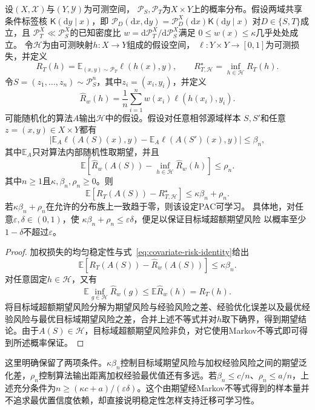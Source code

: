 \begin{theorem}[稳定性条件下的迁移可学习性]
\label{thm:transfer-stability-learning}
设$(X,\mathcal X)$与$(Y,\mathcal Y)$为可测空间，
$\mathcal P_S,\mathcal P_T$为$X\times Y$上的概率分布。假设两域共享条件标签核
$\mathsf K(\mathrm dy\mid x)$，即
$\mathcal P_D(\mathrm dx,\mathrm dy)
=\mathcal P_D^X(\mathrm dx)\mathsf K(\mathrm dy\mid x)$
对$D\in\{S,T\}$成立，且
$\mathcal P_T^X\ll\mathcal P_S^X$的已知密度比
$w=\mathrm d\mathcal P_T^X/\mathrm d\mathcal P_S^X$满足
$0\leq w(x)\leq\kappa$几乎处处成立。
令$\mathcal H$为由可测映射$h:X\to Y$组成的假设空间，
$\ell:Y\times Y\to[0,1]$为可测损失，并定义
\[
 R_T(h)=\mathbb E_{(x,y)\sim\mathcal P_T}\ell(h(x),y),\qquad
 R_{T,\mathcal H}^{\star}=\inf_{h\in\mathcal H}R_T(h).
\]
令$S=(z_1,\ldots,z_n)\sim\mathcal P_S^n$，其中$z_i=(x_i,y_i)$，并定义
\[
 \hat R_w(h)=\frac1n\sum_{i=1}^n w(x_i)\ell(h(x_i),y_i).
\]
可能随机化的算法$A$输出$\mathcal H$中的假设。假设对任意相邻源域样本
$S,S'$和任意$z=(x,y)\in X\times Y$都有
\[
 \left|\mathbb E_A\ell(A(S)(x),y)
 -\mathbb E_A\ell(A(S')(x),y)\right|\leq\beta_n,
\]
其中$\mathbb E_A$只对算法内部随机性取期望，并且
\[
 \mathbb E\!\left[\hat R_w(A(S))-
                  \inf_{h\in\mathcal H}\hat R_w(h)\right]
 \leq\rho_n.
\]
其中$n\geq1$且$\kappa,\beta_n,\rho_n\geq0$。则
\begin{equation}
 \mathbb E[R_T(A(S))-R_{T,\mathcal H}^{\star}]
 \leq\kappa\beta_n+\rho_n.
 \label{eq:transfer-stability-excess}
\end{equation}
若$\kappa\beta_n+\rho_n$在允许的分布族上一致趋于零，则该设定PAC可学习。
具体地，对任意$\varepsilon,\delta\in(0,1)$，使
$\kappa\beta_n+\rho_n\leq\varepsilon\delta$，便足以保证目标域超额期望风险
以概率至少$1-\delta$不超过$\varepsilon$。
\end{theorem}
\begin{proof}
加权损失的均匀稳定性与式~\eqref{eq:covariate-risk-identity}给出
\[
 \mathbb E[R_T(A(S))-\hat R_w(A(S))]\leq\kappa\beta_n.
\]
对任意固定$h\in\mathcal H$，又有
\[
 \mathbb E\inf_{g\in\mathcal H}\hat R_w(g)
 \leq\mathbb E\hat R_w(h)=R_T(h).
\]
将目标域超额期望风险分解为期望风险与经验风险之差、经验优化误差以及最优经验风险与最优目标域期望风险之差，合并上述不等式并对$h$取下确界，得到期望结论。由于$A(S)\in\mathcal H$，目标域超额期望风险非负，对它使用Markov不等式即可得到所述概率保证。
\end{proof}

这里明确保留了两项条件。$\kappa\beta_n$控制目标域期望风险与加权经验风险之间的期望泛化差，$\rho_n$控制算法输出距离加权经验最优值还有多远。若$\beta_n\leq c/n$、$\rho_n\leq a/n$，上述充分条件为$n\geq(\kappa c+a)/(\varepsilon\delta)$。这个由期望经Markov不等式得到的样本量并不追求最优置信度依赖，却直接说明稳定性怎样支持迁移可学习性。

